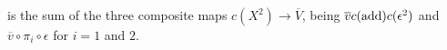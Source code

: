 \documentclass[10pt]{article}
\begin{document}
\begin{Adams Muliplicativity}
is the sum of the three composite maps $c(X^2)\to \overline{V}$, being $\overline{v}\circ c(\textup{add})\circ c(\epsilon^2)$ and $\overline{v}\circ\pi_i\circ\epsilon$ for $i=1$ and $2$.
%

\end{Adams Muliplicativity}
\end{document}
